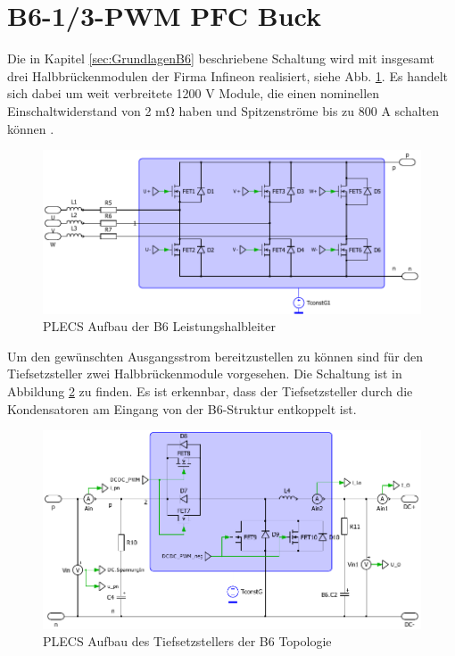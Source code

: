	

\section{B6-1/3-PWM PFC Buck}
Die in Kapitel \ref{sec:GrundlagenB6} beschriebene Schaltung wird mit insgesamt drei Halbbrückenmodulen der Firma Infineon realisiert, siehe Abb. \ref{fig:plecsb6}. Es handelt sich dabei um weit verbreitete 1200 \si{\volt} Module, die einen nominellen Einschaltwiderstand von 2 \si{\milli \ohm} haben und Spitzenströme bis zu 800 \si{\ampere} schalten können \cite{IFAGFF2}.
\begin{figure}[H]
	\centering
	\includegraphics[width=1\linewidth]{content/Grafiken/PLECS_B6}
	\caption{PLECS Aufbau der B6 Leistungshalbleiter}
	\label{fig:plecsb6}
\end{figure}
 Um den gewünschten Ausgangsstrom bereitzustellen zu können sind für den Tiefsetzsteller zwei Halbbrückenmodule vorgesehen. Die Schaltung ist in Abbildung \ref{fig:plecsb6buck} zu finden. Es ist erkennbar, dass der Tiefsetzsteller durch die Kondensatoren am Eingang von der B6-Struktur entkoppelt ist.
 \begin{figure}[H]
 	\centering
 	\includegraphics[width=0.9\linewidth]{content/Grafiken/PLECS_B6Buck}
 	\caption{PLECS Aufbau des Tiefsetzstellers der B6 Topologie}
 	\label{fig:plecsb6buck}
 \end{figure}
 

